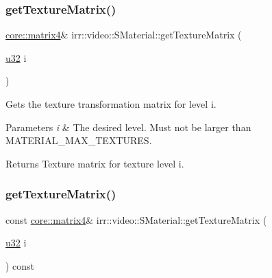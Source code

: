 \subsubsection{\texorpdfstring{get\+Texture\+Matrix()}{getTextureMatrix()}\hspace{0.1cm}{\footnotesize\ttfamily [2/4]}}
{\footnotesize\ttfamily \hyperlink{namespaceirr_1_1core_a4c9d4e29899535971052810954a14431}{core\+::matrix4}\& irr\+::video\+::\+S\+Material\+::get\+Texture\+Matrix (\begin{DoxyParamCaption}\item[{\hyperlink{namespaceirr_a0416a53257075833e7002efd0a18e804}{u32}}]{i }\end{DoxyParamCaption})\hspace{0.3cm}{\ttfamily [inline]}}



Gets the texture transformation matrix for level i. 


\begin{DoxyParams}{Parameters}
{\em i} & The desired level. Must not be larger than M\+A\+T\+E\+R\+I\+A\+L\+\_\+\+M\+A\+X\+\_\+\+T\+E\+X\+T\+U\+R\+ES. \\
\hline
\end{DoxyParams}
\begin{DoxyReturn}{Returns}
Texture matrix for texture level i. 
\end{DoxyReturn}
\mbox{\label{classirr_1_1video_1_1SMaterial_a6b0adff4b14c80da0be8e8d600252fcd}} 
\subsubsection{\texorpdfstring{get\+Texture\+Matrix()}{getTextureMatrix()}\hspace{0.1cm}{\footnotesize\ttfamily [3/4]}}
{\footnotesize\ttfamily const \hyperlink{namespaceirr_1_1core_a4c9d4e29899535971052810954a14431}{core\+::matrix4}\& irr\+::video\+::\+S\+Material\+::get\+Texture\+Matrix (\begin{DoxyParamCaption}\item[{\hyperlink{namespaceirr_a0416a53257075833e7002efd0a18e804}{u32}}]{i }\end{DoxyParamCaption}) const\hspace{0.3cm}{\ttfamily [inline]}}



